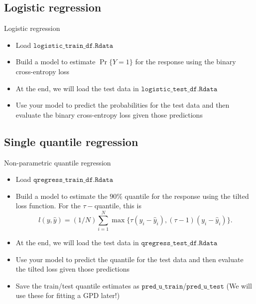 \documentclass{beamer}
\begin{document}
\subsection{Logistic regression}
\begin{frame}{Logistic regression}
\begin{itemize}
\item Load $\texttt{logistic\_train\_df.Rdata}$
\item Build a model to estimate $\Pr\{Y=1\}$ for the response using the binary cross-entropy loss
\item At the end, we will load the test data in  $\texttt{logistic\_test\_df.Rdata}$
\item Use your model to predict the probabilities for the test data and then evaluate the binary cross-entropy loss given those predictions
\end{itemize}
\end{frame}
\subsection{Single quantile regression}
\begin{frame}{Non-parametric quantile regression}
\begin{itemize}
\item Load $\texttt{qregress\_train\_df.Rdata}$
\item Build a model to estimate the $90\%$ quantile for the response using the tilted loss function. For the $\tau-$quantile, this is \[
l(y,\hat{y})=(1/N)\sum^{N}_{i=1}\max\{\tau(y_i-\hat{y}_i),(\tau-1)(y_i-\hat{y}_i)\}.
\]
\item At the end, we will load the test data in  $\texttt{qregress\_test\_df.Rdata}$
\item Use your model to predict the quantile for the test data and then evaluate the tilted loss given those predictions
\item Save the train/test quantile estimates as $\texttt{pred\_u\_train}$/$\texttt{pred\_u\_test}$ (We will use these for fitting a GPD later!)
\end{itemize}
\end{frame}
\end{document}
